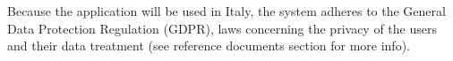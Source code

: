 Because the application will be used in Italy, the system adheres to the General Data Protection Regulation (GDPR), laws concerning the privacy of the users and their data treatment (see reference documents section for more info).

